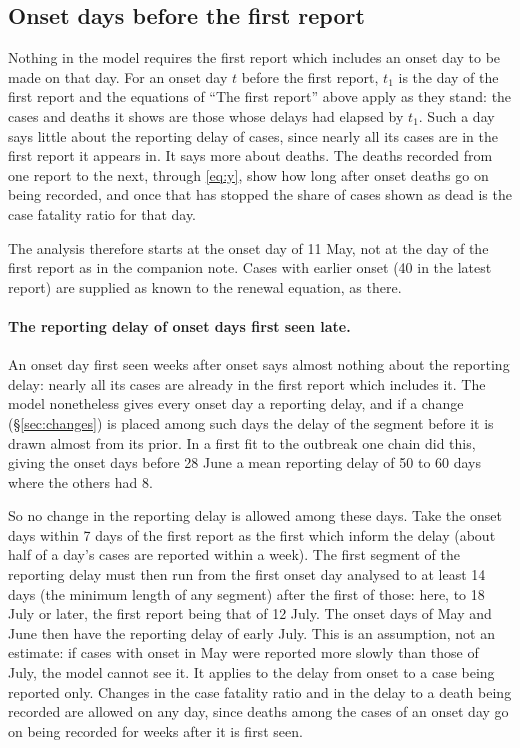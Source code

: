 \documentclass[11pt,a4paper]{article}
\begin{document}
\subsection{Onset days before the first report}\label{sec:early}

Nothing in the model requires the first report which includes an onset day
to be made on that day. For an onset day $t$ before the first report, $t_1$
is the day of the first report and the equations of ``The first report''
above apply as they stand: the cases and deaths it shows are those whose
delays had elapsed by $t_1$. Such a day says little about the reporting
delay of cases, since nearly all its cases are in the first report it
appears in. It says more about deaths. The deaths recorded from one report
to the next, through \eqref{eq:y}, show how long after onset deaths go on
being recorded, and once that has stopped the share of cases shown as dead
is the case fatality ratio for that day.

The analysis therefore starts at the onset day of 11 May, not at the day of
the first report as in the companion note. Cases with earlier onset (40 in
the latest report) are supplied as known to the renewal equation, as there.

\paragraph{The reporting delay of onset days first seen late.} An onset
day first seen weeks after onset says almost nothing about the reporting
delay: nearly all its cases are already in the first report which includes
it. The model nonetheless gives every onset day a reporting delay, and if a
change (\S\ref{sec:changes}) is placed among such days the delay of the
segment before it is drawn almost from its prior. In a first fit to the
outbreak one chain did this, giving the onset days before 28 June a mean
reporting delay of 50 to 60 days where the others had 8.

So no change in the reporting delay is allowed among these days. Take the
onset days within 7 days of the first report as the first which inform the
delay (about half of a day's cases are reported within a week). The first
segment of the reporting delay must then run from the first onset day
analysed to at least 14 days (the minimum length of any segment) after the
first of those: here, to 18 July or later, the first report being that of
12 July. The onset days of May and June then have the reporting delay of
early July. This is an assumption, not an estimate: if cases with onset in
May were reported more slowly than those of July, the model cannot see it.
It applies to the delay from onset to a case being reported only. Changes
in the case fatality ratio and in the delay to a death being recorded are
allowed on any day, since deaths among the cases of an onset day go on
being recorded for weeks after it is first seen.
\end{document}
